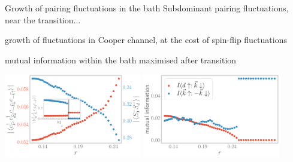 \documentclass[8pt,aspectratio=169]{beamer}
\begin{document}
\begin{frame}{Growth of pairing fluctuations in the bath}
\centering
\alert{Subdominant pairing fluctuations}, near the transition...

\vspace*{\fill}

\begin{minipage}{0.42\textwidth}
\begin{itemize}
	\nitem growth of fluctuations in Cooper channel, at the cost of spin-flip fluctuations
\end{itemize}
\end{minipage}
\hspace*{\fill}
\begin{minipage}{0.4\textwidth}
\begin{itemize}
	\nitem mutual information within the bath maximised after transition
\end{itemize}
\end{minipage}

\vspace*{\fill}

\includegraphics[width=0.45\textwidth]{spinflip-pairing.pdf}
\hspace*{\fill}
\includegraphics[width=0.45\textwidth]{I_k.pdf}
\end{frame}
\end{document}
